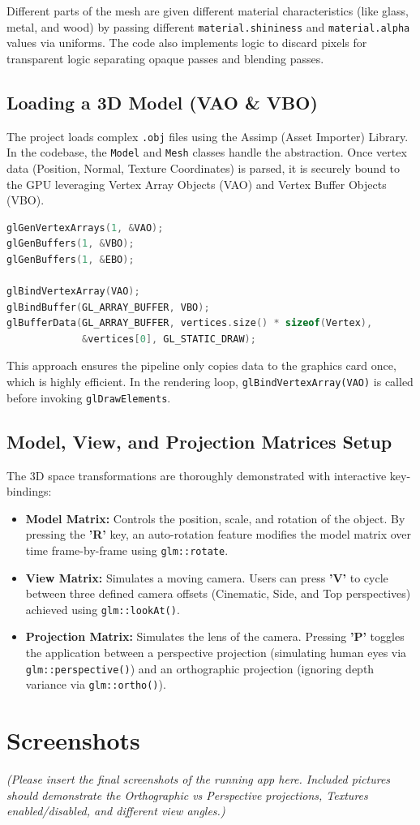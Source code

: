 \documentclass{article}
\begin{document}
Different parts of the mesh are given different material characteristics (like glass, metal, and wood) by passing different \texttt{material.shininess} and \texttt{material.alpha} values via uniforms. The code also implements logic to discard pixels for transparent logic separating opaque passes and blending passes.

\subsection{Loading a 3D Model (VAO \& VBO)}
The project loads complex \texttt{.obj} files using the Assimp (Asset Importer) Library. In the codebase, the \texttt{Model} and \texttt{Mesh} classes handle the abstraction. Once vertex data (Position, Normal, Texture Coordinates) is parsed, it is securely bound to the GPU leveraging Vertex Array Objects (VAO) and Vertex Buffer Objects (VBO).

\begin{lstlisting}[language=C++]
glGenVertexArrays(1, &VAO);
glGenBuffers(1, &VBO);
glGenBuffers(1, &EBO);

glBindVertexArray(VAO);
glBindBuffer(GL_ARRAY_BUFFER, VBO);
glBufferData(GL_ARRAY_BUFFER, vertices.size() * sizeof(Vertex), 
             &vertices[0], GL_STATIC_DRAW);
\end{lstlisting}

This approach ensures the pipeline only copies data to the graphics card once, which is highly efficient. In the rendering loop, \texttt{glBindVertexArray(VAO)} is called before invoking \texttt{glDrawElements}.

\subsection{Model, View, and Projection Matrices Setup}
The 3D space transformations are thoroughly demonstrated with interactive key-bindings:

\begin{itemize}
    \item \textbf{Model Matrix:} Controls the position, scale, and rotation of the object. By pressing the \textbf{'R'} key, an auto-rotation feature modifies the model matrix over time frame-by-frame using \texttt{glm::rotate}.
    \item \textbf{View Matrix:} Simulates a moving camera. Users can press \textbf{'V'} to cycle between three defined camera offsets (Cinematic, Side, and Top perspectives) achieved using \texttt{glm::lookAt()}.
    \item \textbf{Projection Matrix:} Simulates the lens of the camera. Pressing \textbf{'P'} toggles the application between a perspective projection (simulating human eyes via \texttt{glm::perspective()}) and an orthographic projection (ignoring depth variance via \texttt{glm::ortho()}).
\end{itemize}

\section{Screenshots}
\textit{(Please insert the final screenshots of the running app here. Included pictures should demonstrate the Orthographic vs Perspective projections, Textures enabled/disabled, and different view angles.)}
\end{document}
